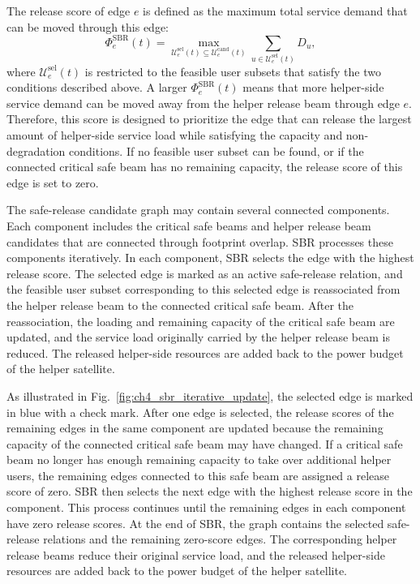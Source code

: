 The release score of edge $e$ is defined as the maximum total service demand that can be moved through this edge:
\begin{equation}
\label{eq:ch4_sbr_score}
\Phi_e^{\mathrm{SBR}}(t)=
\max_{\mathcal{U}_e^{\mathrm{sel}}(t)\subseteq \mathcal{U}_e^{\mathrm{cand}}(t)}
\sum_{u\in \mathcal{U}_e^{\mathrm{sel}}(t)} D_u,
\tag{10}
\end{equation}
where $\mathcal{U}_e^{\mathrm{sel}}(t)$ is restricted to the feasible user subsets that satisfy the two conditions described above. A larger $\Phi_e^{\mathrm{SBR}}(t)$ means that more helper-side service demand can be moved away from the helper release beam through edge $e$. Therefore, this score is designed to prioritize the edge that can release the largest amount of helper-side service load while satisfying the capacity and non-degradation conditions. If no feasible user subset can be found, or if the connected critical safe beam has no remaining capacity, the release score of this edge is set to zero.

The safe-release candidate graph may contain several connected components. Each component includes the critical safe beams and helper release beam candidates that are connected through footprint overlap. SBR processes these components iteratively. In each component, SBR selects the edge with the highest release score. The selected edge is marked as an active safe-release relation, and the feasible user subset corresponding to this selected edge is reassociated from the helper release beam to the connected critical safe beam. After the reassociation, the loading and remaining capacity of the critical safe beam are updated, and the service load originally carried by the helper release beam is reduced. The released helper-side resources are added back to the power budget of the helper satellite.

As illustrated in Fig.~\ref{fig:ch4_sbr_iterative_update}, the selected edge is marked in blue with a check mark. After one edge is selected, the release scores of the remaining edges in the same component are updated because the remaining capacity of the connected critical safe beam may have changed. If a critical safe beam no longer has enough remaining capacity to take over additional helper users, the remaining edges connected to this safe beam are assigned a release score of zero. SBR then selects the next edge with the highest release score in the component. This process continues until the remaining edges in each component have zero release scores. At the end of SBR, the graph contains the selected safe-release relations and the remaining zero-score edges. The corresponding helper release beams reduce their original service load, and the released helper-side resources are added back to the power budget of the helper satellite.

